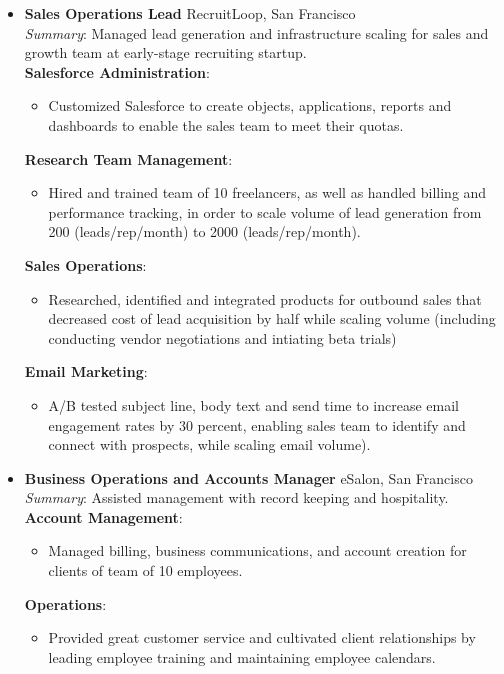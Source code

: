 \documentclass[]{friggeri-cv}
\renewenvironment{entrylist}{%
  \begin{itemize}[leftmargin=1in] %
}{%
  \end{itemize}
}
\renewcommand{\entry}[4]{%
  \item[#1]
    \textbf{#2}%
    \hfill%
    {\footnotesize\addfontfeature{Color=lightgray} #3}\\%
    #4\vspace{\parsep}%
  }
\begin{document}
\begin{entrylist}

  \entry
    {07/14---01/15}
    {Sales Operations Lead}
    {RecruitLoop, San Francisco}
    {\textit{Summary}: Managed lead generation and infrastructure scaling for sales and growth team at early-stage recruiting startup.\\

\textbf {Salesforce Administration}: 
\begin{itemize}
\item Customized Salesforce to create objects, applications, reports and dashboards to enable the sales team to meet their quotas.
\end{itemize}

\textbf {Research Team Management}:
\begin{itemize}
\item Hired and trained team of 10 freelancers, as well as handled billing and performance tracking, in order to scale volume of lead generation from 200 (leads/rep/month) to 2000 (leads/rep/month).
\end{itemize}

\textbf {Sales Operations}: 
\begin{itemize}
\item Researched, identified and integrated products for outbound sales that decreased cost of lead acquisition by half while scaling volume (including conducting vendor negotiations and intiating beta trials)
\end{itemize}

\textbf {Email Marketing}: 
\begin{itemize}
\item A/B tested subject line, body text and send time to increase email engagement rates by 30 percent, enabling sales team to identify and connect with prospects, while scaling email volume).
\end{itemize}
}

   \entry
    {12/13---04/14}
    {Business Operations and Accounts Manager}
    {eSalon, San Francisco}
    {
\textit{Summary}: Assisted management with record keeping and hospitality.\\ 

\textbf {Account Management}: 
\begin{itemize}
\item Managed billing, business communications, and account creation for clients of team of 10 employees.
\end{itemize}

\textbf {Operations}: 
\begin{itemize}
\item Provided great customer service and cultivated client relationships by leading employee training and maintaining employee calendars.
\end{itemize}
}
\end{entrylist}	
\end{document}
